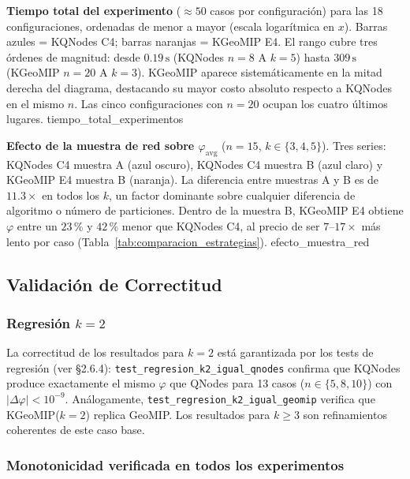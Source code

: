 %
  {\textbf{Tiempo total del experimento} ($\approx 50$ casos por
   configuración) para las 18 configuraciones, ordenadas de menor
   a mayor (escala logarítmica en $x$).
   Barras azules = KQNodes C4; barras naranjas = KGeoMIP E4.
   El rango cubre tres órdenes de magnitud: desde
   $0.19\,\mathrm{s}$ (KQNodes $n=8$ A $k=5$) hasta
   $309\,\mathrm{s}$ (KGeoMIP $n=20$ A $k=3$).
   KGeoMIP aparece sistemáticamente en la mitad derecha del diagrama,
   destacando su mayor costo absoluto respecto a KQNodes en el mismo $n$.
   Las cinco configuraciones con $n=20$ ocupan los cuatro últimos lugares.}%
  {tiempo_total_experimentos}

%
  {\textbf{Efecto de la muestra de red sobre $\varphi_{\mathrm{avg}}$}
   ($n=15$, $k \in \{3,4,5\}$).
   Tres series: KQNodes C4 muestra A (azul oscuro), KQNodes C4 muestra B
   (azul claro) y KGeoMIP E4 muestra B (naranja).
   La diferencia entre muestras A y B es de $11.3\times$ en todos los $k$,
   un factor dominante sobre cualquier diferencia de algoritmo o número
   de particiones.
   Dentro de la muestra B, KGeoMIP E4 obtiene $\varphi$ entre un $23$\,\%
   y $42$\,\% menor que KQNodes C4, al precio de ser $7$--$17\times$ más
   lento por caso (Tabla~\ref{tab:comparacion_estrategias}).}%
  {efecto_muestra_red}

\subsection{Validación de Correctitud}

\subsubsection*{Regresión $k=2$}

La correctitud de los resultados para $k=2$ está garantizada por los
tests de regresión (ver §2.6.4): \texttt{test\_regresion\_k2\_igual\_qnodes}
confirma que KQNodes produce exactamente el mismo $\varphi$ que QNodes
para 13 casos ($n \in \{5,8,10\}$) con $|\Delta\varphi| < 10^{-9}$.
Análogamente, \texttt{test\_regresion\_k2\_igual\_geomip} verifica que
KGeoMIP($k=2$) replica GeoMIP. Los resultados para $k \geq 3$ son
refinamientos coherentes de este caso base.

\subsubsection*{Monotonicidad verificada en todos los experimentos}


